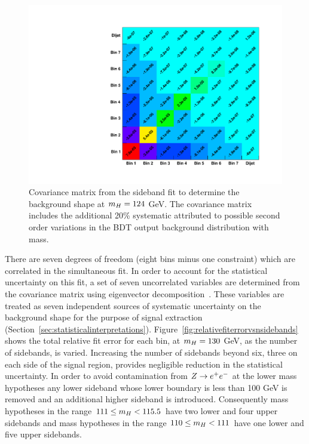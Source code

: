 \begin{figure}
 \begin{center}
  \includegraphics[width=.8\textwidth]{hgg7TeV/sidebandMvaPlots/fits/covariance_m124}
 \end{center}
 \caption{Covariance matrix from the sideband fit to determine the background shape at
 $m_{H}=124$ GeV. The covariance matrix includes the additional 20\% systematic attributed to possible second
 order variations in the BDT output background distribution with mass.}
 \label{fig:covariance}
\end{figure}

There are seven degrees of freedom (eight bins minus one constraint) which are correlated in the simultaneous fit.
In order to account for the statistical uncertainty on this fit, a set of seven uncorrelated variables
are determined from the covariance matrix using eigenvector decomposition~\citep{pca}. These variables 
are treated as seven independent sources of systematic uncertainty on the background shape
for the purpose of signal extraction (Section~\ref{sec:statisticalinterpretations}). 
Figure~\ref{fig:relativefiterrorvsnsidebands} shows the total relative fit error for each bin, 
at $m_{H}=130$ GeV, as the number of 
sidebands, is varied.
Increasing the number of sidebands beyond six, three on each side of the signal region,
provides negligible reduction in the statistical uncertainty.
In order to avoid contamination from $Z\rightarrow e^{+}e^{-}$ at the lower mass hypotheses
any lower sideband whose lower boundary is less than 100 GeV is removed and an additional higher
sideband is introduced. Consequently mass hypotheses in the range $111 \le m_{H} < 115.5$ have
two lower and four upper sidebands and mass hypotheses in the range $110 \le m_{H} < 111$ have
one lower and five upper sidebands.

